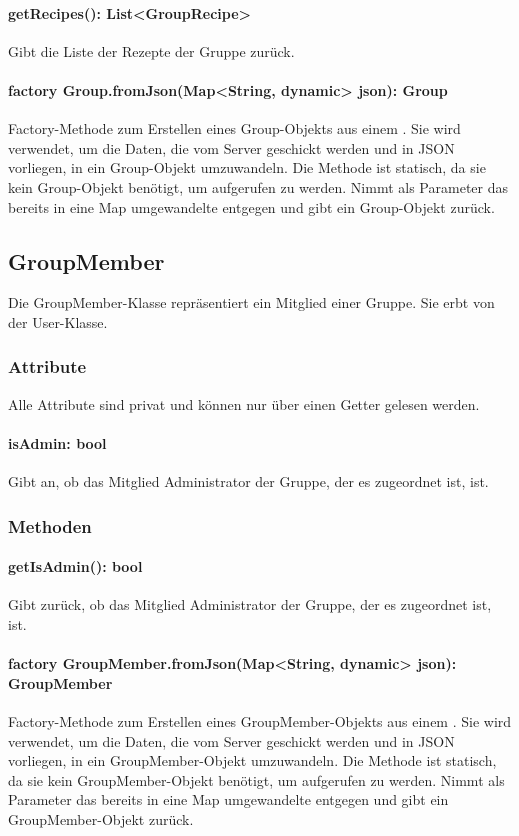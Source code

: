 \documentclass[parskip=full]{scrartcl}
\begin{document}
\paragraph{getRecipes(): List<GroupRecipe>}
Gibt die Liste der Rezepte der Gruppe zurück.
\paragraph{factory Group.fromJson(Map<String, dynamic> json): Group} Factory-Methode zum Erstellen eines Group-Objekts aus einem . Sie wird verwendet, um die Daten, die vom Server geschickt werden und in \Gls{JSON} vorliegen, in ein Group-Objekt umzuwandeln. Die Methode ist statisch, da sie kein Group-Objekt benötigt, um aufgerufen zu werden. Nimmt als Parameter das bereits in eine Map umgewandelte  entgegen und gibt ein Group-Objekt zurück.

\newpage
\subsection{GroupMember}
Die GroupMember-Klasse repräsentiert ein Mitglied einer Gruppe. Sie erbt von der User-Klasse.
\subsubsection*{Attribute}
Alle Attribute sind privat und können nur über einen Getter gelesen werden.
\paragraph{isAdmin: bool}
Gibt an, ob das Mitglied Administrator der Gruppe, der es zugeordnet ist, ist.
\subsubsection*{Methoden}
\paragraph{getIsAdmin(): bool}
Gibt zurück, ob das Mitglied Administrator der Gruppe, der es zugeordnet ist, ist.
\paragraph{factory GroupMember.fromJson(Map<String, dynamic> json): GroupMember} Factory-Methode zum Erstellen eines GroupMember-Objekts aus einem . Sie wird verwendet, um die Daten, die vom Server geschickt werden und in \Gls{JSON} vorliegen, in ein GroupMember-Objekt umzuwandeln. Die Methode ist statisch, da sie kein GroupMember-Objekt benötigt, um aufgerufen zu werden. Nimmt als Parameter das bereits in eine Map umgewandelte  entgegen und gibt ein GroupMember-Objekt zurück.
\newpage
\end{document}
